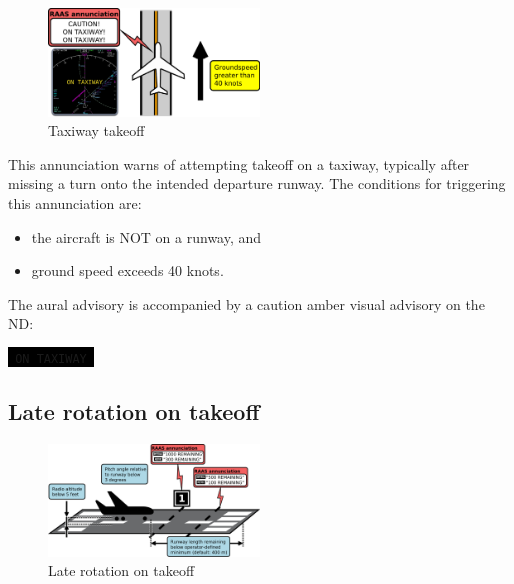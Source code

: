 \documentclass[a4paper,12pt]{article}
\newcommand{\visualadvisory}[3][b]{%
    \ifthenelse{\equal{#1}{b}}{\begin{center}}{}
    \noindent
    \colorbox{black}{\textcolor{#2visualadvisorycolor}{\large\texttt{~#3~}}}
    \ifthenelse{\equal{#1}{b}}{\end{center}}{}}
\begin{document}
\begin{figure}
\vspace{-4em}
\begin{center}
\includegraphics[width=0.5\textwidth]{../src/twy_takeoff.pdf}
\end{center}
\caption{Taxiway takeoff}
\vspace{-4em}
\end{figure}

This annunciation warns of attempting takeoff on a taxiway, typically
after missing a turn onto the intended departure runway. The conditions
for triggering this annunciation are:

\begin{itemize}

\item the aircraft is NOT on a runway, and

\item ground speed exceeds 40 knots.

\end{itemize}

\noindent The aural advisory is accompanied by a caution amber visual
advisory on the ND:

\visualadvisory{nonroutine}{ON TAXIWAY}

\newpage
\subsection{Late rotation on takeoff}
\label{subsec:LateRotationMon}

\begin{figure}
\begin{center}
\includegraphics[width=0.5\textwidth]{../src/takeoff_roll.pdf}
\end{center}
\caption{Late rotation on takeoff}
\end{figure}
\end{document}
